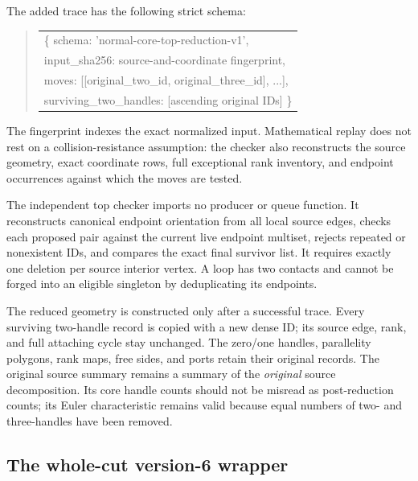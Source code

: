 The added trace has the following strict schema:
\begin{quote}\small\ttfamily
\begin{tabular}{@{}l@{}}
\{ schema: 'normal-core-top-reduction-v1',\\
\quad input\_sha256: source-and-coordinate fingerprint,\\
\quad moves: [[original\_two\_id, original\_three\_id], ...],\\
\quad surviving\_two\_handles: [ascending original IDs] \}
\end{tabular}
\end{quote}
The fingerprint indexes the exact normalized input. Mathematical replay does
not rest on a collision-resistance assumption: the checker also reconstructs
the source geometry, exact coordinate rows, full exceptional rank inventory,
and endpoint occurrences against which the moves are tested.

The independent top checker imports no producer or queue function. It
reconstructs canonical endpoint orientation from all local source edges,
checks each proposed pair against the current live endpoint multiset,
rejects repeated or nonexistent IDs, and compares the exact final survivor
list. It requires exactly one deletion per source interior vertex. A loop
has two contacts and cannot be forged into an eligible singleton by
deduplicating its endpoints.

The reduced geometry is constructed only after a successful trace. Every
surviving two-handle record is copied with a new dense ID; its source edge,
rank, and full attaching cycle stay unchanged. The zero/one handles,
parallelity polygons, rank maps, free sides, and ports retain their
original records. The original source summary remains a summary of the
\emph{original} source decomposition. Its core handle counts should not be
misread as post-reduction counts; its Euler characteristic remains valid
because equal numbers of two- and three-handles have been removed.

\subsection{The whole-cut version-6 wrapper}

